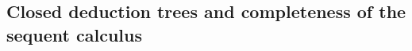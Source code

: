 

\setcounter{section}{2}
\setcounter{subsection}{7}
\setcounter{dfn}{16}

\subsection{Closed deduction trees and completeness of the sequent calculus}

